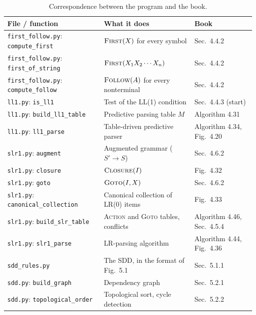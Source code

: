 \documentclass[11pt,a4paper]{article}
\newcommand{\First}{\textsc{First}}
\newcommand{\Follow}{\textsc{Follow}}
\newcommand{\Closure}{\textsc{Closure}}
\newcommand{\Goto}{\textsc{Goto}}
\newcommand{\Action}{\textsc{Action}}
\newcommand{\code}[1]{\texttt{#1}}
\begin{document}
\begin{table}[H]
\centering
\small
\begin{tabular}{@{}lll@{}}
\toprule
File / function & What it does & Book \\
\midrule
\code{first\_follow.py}: \code{compute\_first} & $\First(X)$ for every symbol & Sec.~4.4.2 \\
\code{first\_follow.py}: \code{first\_of\_string} & $\First(X_1X_2\cdots X_n)$ & Sec.~4.4.2 \\
\code{first\_follow.py}: \code{compute\_follow} & $\Follow(A)$ for every nonterminal & Sec.~4.4.2 \\
\code{ll1.py}: \code{is\_ll1} & Test of the LL(1) condition & Sec.~4.4.3 (start) \\
\code{ll1.py}: \code{build\_ll1\_table} & Predictive parsing table $M$ & Algorithm 4.31 \\
\code{ll1.py}: \code{ll1\_parse} & Table-driven predictive parser & Algorithm 4.34, Fig.~4.20 \\
\code{slr1.py}: \code{augment} & Augmented grammar ($S' \to S$) & Sec.~4.6.2 \\
\code{slr1.py}: \code{closure} & $\Closure(I)$ & Fig.~4.32 \\
\code{slr1.py}: \code{goto} & $\Goto(I, X)$ & Sec.~4.6.2 \\
\code{slr1.py}: \code{canonical\_collection} & Canonical collection of LR(0) items & Fig.~4.33 \\
\code{slr1.py}: \code{build\_slr\_table} & \Action{} and \Goto{} tables, conflicts & Algorithm 4.46, Sec.~4.5.4 \\
\code{slr1.py}: \code{slr1\_parse} & LR-parsing algorithm & Algorithm 4.44, Fig.~4.36 \\
\code{sdd\_rules.py} & The SDD, in the format of Fig.~5.1 & Sec.~5.1.1 \\
\code{sdd.py}: \code{build\_graph} & Dependency graph & Sec.~5.2.1 \\
\code{sdd.py}: \code{topological\_order} & Topological sort, cycle detection & Sec.~5.2.2 \\
\bottomrule
\end{tabular}
\caption{Correspondence between the program and the book.}
\label{tab:map}
\end{table}
\end{document}
